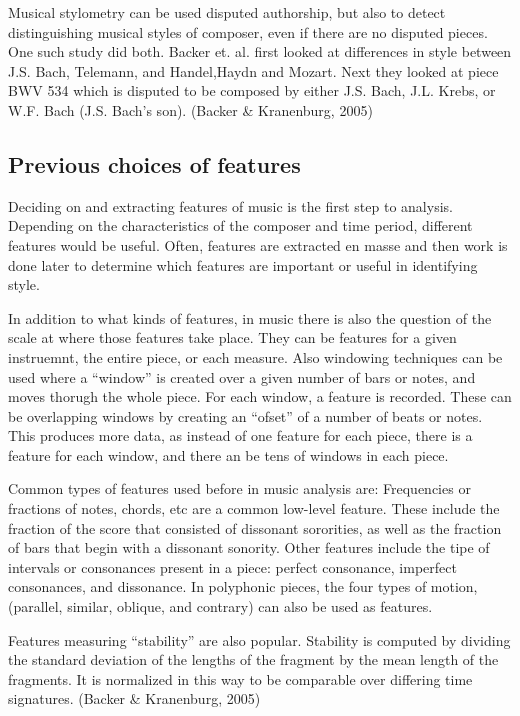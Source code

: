\documentclass[12pt,twoside]{reedthesis}
\theoremstyle{definition}
\theoremstyle{definition}
\theoremstyle{definition}
\theoremstyle{remark}
\begin{document}
Musical stylometry can be used disputed authorship, but also to detect
distinguishing musical styles of composer, even if there are no disputed
pieces. One such study did both. Backer et. al. first looked at
differences in style between J.S. Bach, Telemann, and Handel,Haydn and
Mozart. Next they looked at piece BWV 534 which is disputed to be
composed by either J.S. Bach, J.L. Krebs, or W.F. Bach (J.S. Bach's
son). (Backer \& Kranenburg, 2005)

\subsection{Previous choices of
features}\label{previous-choices-of-features}

Deciding on and extracting features of music is the first step to
analysis. Depending on the characteristics of the composer and time
period, different features would be useful. Often, features are
extracted en masse and then work is done later to determine which
features are important or useful in identifying style.

In addition to what kinds of features, in music there is also the
question of the scale at where those features take place. They can be
features for a given instruemnt, the entire piece, or each measure. Also
windowing techniques can be used where a ``window'' is created over a
given number of bars or notes, and moves thorugh the whole piece. For
each window, a feature is recorded. These can be overlapping windows by
creating an ``ofset'' of a number of beats or notes. This produces more
data, as instead of one feature for each piece, there is a feature for
each window, and there an be tens of windows in each piece.

Common types of features used before in music analysis are: Frequencies
or fractions of notes, chords, etc are a common low-level feature. These
include the fraction of the score that consisted of dissonant
sororities, as well as the fraction of bars that begin with a dissonant
sonority. Other features include the tipe of intervals or consonances
present in a piece: perfect consonance, imperfect consonances, and
dissonance. In polyphonic pieces, the four types of motion, (parallel,
similar, oblique, and contrary) can also be used as features.

Features measuring ``stability'' are also popular. Stability is computed
by dividing the standard deviation of the lengths of the fragment by the
mean length of the fragments. It is normalized in this way to be
comparable over differing time signatures. (Backer \& Kranenburg, 2005)
\end{document}
